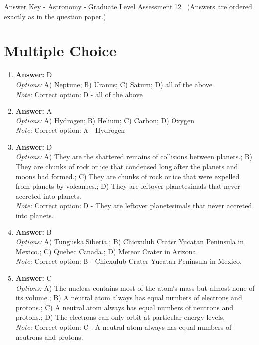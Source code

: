\documentclass[12pt]{article}
\begin{document}
\begin{center}
Answer Key - Astronomy - Graduate Level Assessment 12 \
\small (Answers are ordered exactly as in the question paper.)
\end{center}

\section*{Multiple Choice}
\begin{enumerate}[label=\arabic*.]
\item \textbf{Answer:} D
\\ \textit{Options:} A) Neptune; B) Uranus; C) Saturn; D) all of the above
\\ \textit{Note:} Correct option: D - all of the above
\item \textbf{Answer:} A
\\ \textit{Options:} A) Hydrogen; B) Helium; C) Carbon; D) Oxygen
\\ \textit{Note:} Correct option: A - Hydrogen
\item \textbf{Answer:} D
\\ \textit{Options:} A) They are the shattered remains of collisions between planets.; B) They are chunks of rock or ice that condensed long after the planets and moons had formed.; C) They are chunks of rock or ice that were expelled from planets by volcanoes.; D) They are leftover planetesimals that never accreted into planets.
\\ \textit{Note:} Correct option: D - They are leftover planetesimals that never accreted into planets.
\item \textbf{Answer:} B
\\ \textit{Options:} A) Tunguska Siberia.; B) Chicxulub Crater Yucatan Peninsula in Mexico.; C) Quebec Canada.; D) Meteor Crater in Arizona.
\\ \textit{Note:} Correct option: B - Chicxulub Crater Yucatan Peninsula in Mexico.
\item \textbf{Answer:} C
\\ \textit{Options:} A) The nucleus contains most of the atom's mass but almost none of its volume.; B) A neutral atom always has equal numbers of electrons and protons.; C) A neutral atom always has equal numbers of neutrons and protons.; D) The electrons can only orbit at particular energy levels.
\\ \textit{Note:} Correct option: C - A neutral atom always has equal numbers of neutrons and protons.
\end{enumerate}
\end{document}
